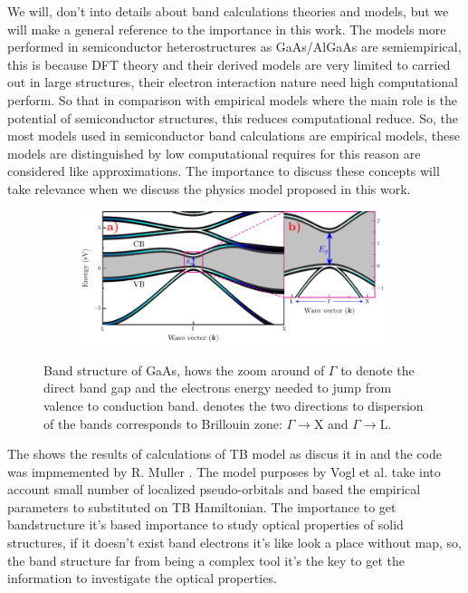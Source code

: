 We will, don't into details about band calculations theories and models, but we will make a general reference to the importance in this work. The models more performed in semiconductor heterostructures as GaAs/AlGaAs are semiempirical, this is because DFT theory and their derived models are very limited to carried out in large structures, their electron interaction nature need high computational perform. So that in comparison with empirical models where the main role is the potential of semiconductor structures, this reduces computational reduce. So, the most models used in semiconductor band calculations are empirical models, these models are distinguished by low computational requires for this reason are considered like approximations. The importance to discuss these concepts will take relevance when we discuss the physics model proposed in this work. 

\begin{figure}[h!]\label{fig:subsubsection-1.1.1-GaAsbands-1}
	\centering
	\begin{subfigure}{\textwidth}
	\includegraphics[width=\linewidth]{../figures/chapter-1/bands/build/bands01}
	\label{subfig:subsubsection-1.1.1-GaAsbands-1-a)}
	\label{subfig:subsubsection-1.1.1-GaAsbands-1-b)}
\end{subfigure}
	\caption{Band structure of GaAs,  hows the zoom around of $\Gamma$  to denote the direct band gap and the electrons energy  needed to jump from valence to conduction band.  denotes the two directions to dispersion of the bands corresponds to Brillouin zone: $\Gamma\to\mathrm{X}$ and  $\Gamma\to\mathrm{L}$.\cite{fox2002optical}}
\end{figure}

The  shows the results of calculations of TB model as discus it in \cite{vogl1983asemiempirical} and the code was impmemented by R. Muller \cite{rpmuller2017}. The model purposes by Vogl et al.  take into account small number of localized pseudo-orbitals and based the empirical parameters to substituted on TB Hamiltonian. 
The importance to get bandstructure it's based  importance to study optical properties of solid structures, if it doesn't exist  band electrons it's like look a place without map, so, the band structure  far from being  a complex tool it's the key to get the information to investigate the optical properties. 

